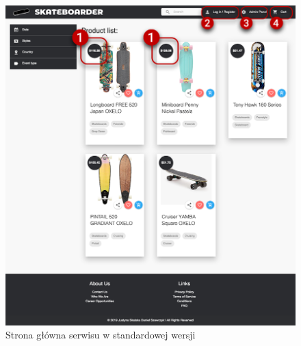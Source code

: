 \documentclass[12pt,a4paper,titlepage]{article}
\begin{document}
\begin{figure}[H]
    \centering
    \includegraphics[width=14cm]{Pics/mainPage.png}
    \caption{Strona główna serwisu w standardowej wersji}
    \label{pic:mainPage}
\end{figure}
\end{document}
